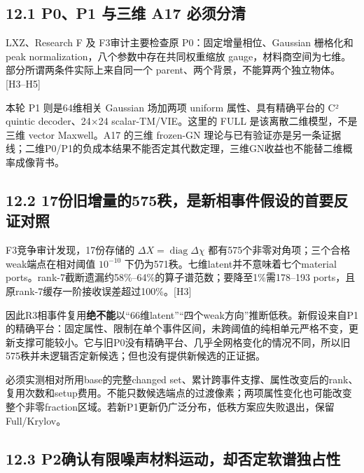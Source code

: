 \documentclass[
  11pt,
  a4paper,
]{article}
\begin{document}
\hypertarget{p0p1-ux4e0eux4e09ux7ef4-a17-ux5fc5ux987bux5206ux6e05}{%
\subsection{12.1 P0、P1 与三维 A17
必须分清}\label{p0p1-ux4e0eux4e09ux7ef4-a17-ux5fc5ux987bux5206ux6e05}}

LXZ、Research F 及 F3审计主要检查原 P0：固定增量相位、Gaussian 栅格化和
peak normalization，八个参数中存在共同权重缩放
gauge，材料商空间为七维。部分所谓两条件实际上来自同一个
parent、两个背景，不能算两个独立物体。{[}H3--H5{]}

本轮 P1 则是64维相关 Gaussian 场加两项 uniform 属性、具有精确平台的 C²
quintic decoder、24×24 scalar-TM/VIE。这里的 FULL
是该离散二维模型，不是三维 vector Maxwell。A17 的三维 frozen-GN
理论与已有验证亦是另一条证据线；二维P0/P1的负成本结果不能否定其代数定理，三维GN收益也不能替二维概率成像背书。

\hypertarget{ux4efdux65e7ux589eux91cfux7684575ux79e9ux662fux65b0ux76f8ux4e8bux4ef6ux5047ux8bbeux7684ux9996ux8981ux53cdux8bc1ux5bf9ux7167}{%
\subsection{12.2
17份旧增量的575秩，是新相事件假设的首要反证对照}\label{ux4efdux65e7ux589eux91cfux7684575ux79e9ux662fux65b0ux76f8ux4e8bux4ef6ux5047ux8bbeux7684ux9996ux8981ux53cdux8bc1ux5bf9ux7167}}

F3竞争审计发现，17份存储的 \(\Delta X=\operatorname{diag}\Delta\chi\)
都有575个非零对角项；三个合格weak端点在相对阈值 \(10^{-10}\)
下仍为571秩。七维latent并不意味着七个material
ports。rank-7截断遗漏约58\%--64\%的算子谱范数；要降至1\%需178--193
ports，且原rank-7缓存一阶接收误差超过100\%。{[}H3{]}

因此R3相事件复用\textbf{绝不能}以``66维latent''``四个weak方向''推断低秩。新假设来自P1的精确平台：固定属性、限制在单个事件区间，未跨阈值的纯相单元严格不变，更新支撑可能较小。它与旧P0没有精确平台、几乎全网格变化的情况不同，所以旧575秩并未逻辑否定新候选；但也没有提供新候选的正证据。

必须实测相对所用base的完整changed
set、累计跨事件支撑、属性改变后的rank、复用次数和setup费用。不能只数候选端点的过渡像素；两项属性变化也可能改变整个非零fraction区域。若新P1更新仍广泛分布，低秩方案应失败退出，保留Full/Krylov。

\hypertarget{p2ux786eux8ba4ux6709ux9650ux566aux58f0ux6750ux6599ux8fd0ux52a8ux5374ux5426ux5b9aux8f6fux8c31ux72ecux5360ux6027}{%
\subsection{12.3
P2确认有限噪声材料运动，却否定软谱独占性}\label{p2ux786eux8ba4ux6709ux9650ux566aux58f0ux6750ux6599ux8fd0ux52a8ux5374ux5426ux5b9aux8f6fux8c31ux72ecux5360ux6027}}
\end{document}
